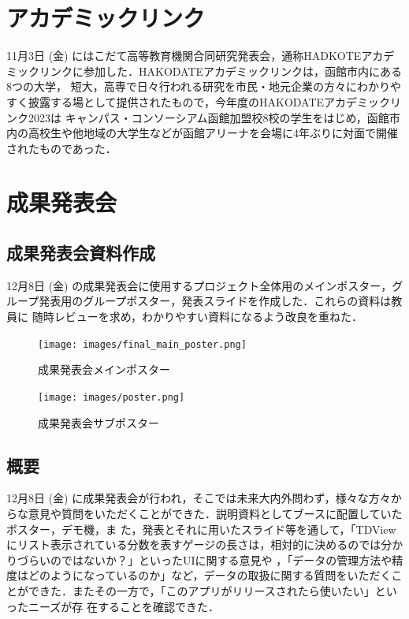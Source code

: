 \section{アカデミックリンク}
11月3日 (金) にはこだて高等教育機関合同研究発表会，通称HADKOTEアカデミックリンクに参加した．HAKODATEアカデミックリンクは，函館市内にある8つの大学，
短大，高専で日々行われる研究を市民・地元企業の方々にわかりやすく披露する場として提供されたもので，今年度のHAKODATEアカデミックリンク2023は
キャンパス・コンソーシアム函館加盟校8校の学生をはじめ，函館市内の高校生や他地域の大学生などが函館アリーナを会場に4年ぶりに対面で開催されたものであった．

\section{成果発表会}
\subsection{成果発表会資料作成}
12月8日 (金) の成果発表会に使用するプロジェクト全体用のメインポスター，グループ発表用のグループポスター，発表スライドを作成した．これらの資料は教員に
随時レビューを求め，わかりやすい資料になるよう改良を重ねた．

\begin{figure}[htbp]
    \centering
    \texttt{[image: images/final\_main\_poster.png]}
    \caption{成果発表会メインポスター}
    \label{fig:final_main_poster}
\end{figure}

\begin{figure}[htbp]
    \centering
    \texttt{[image: images/poster.png]}
    \caption{成果発表会サブポスター}
    \label{fig:poster}
\end{figure}


\subsection{概要}
12月8日 (金) に成果発表会が行われ，そこでは未来大内外問わず，様々な方々からな意見や質問をいただくことができた．説明資料としてブースに配置していたポスター，デモ機，ま
た，発表とそれに用いたスライド等を通して，「TDViewにリスト表示されている分数を表すゲージの長さは，相対的に決めるのでは分かりづらいのではないか？」といったUIに関する意見や
，「データの管理方法や精度はどのようになっているのか」など，データの取扱に関する質問をいただくことができた．またその一方で，「このアプリがリリースされたら使いたい」といったニーズが存
在することを確認できた．

